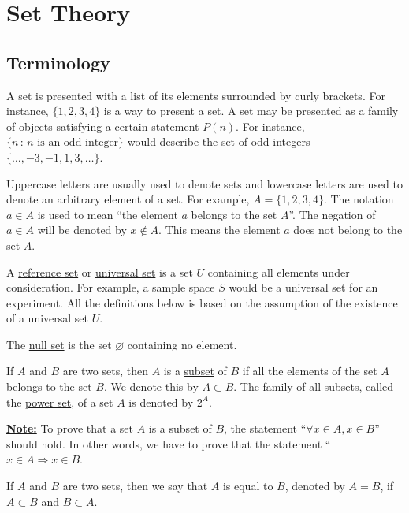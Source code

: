 \chapter{Set Theory}


\section{Terminology}

A set is presented with a list of its elements surrounded by curly brackets. For instance, $\{1, 2, 3, 4\}$ is a way to present a set. A set may be presented as a family of objects satisfying a certain statement $P (n)$. For instance, $\{ n \, : \, n \text{ is an odd integer}\}$ would describe the set of odd integers $\{ \ldots , -3 , -1 , 1, 3, \ldots \}$.

Uppercase letters are usually used to denote sets and lowercase letters are used to denote an arbitrary element of a set. For example, $A = \{ 1 , 2, 3, 4\}$. The notation $a \in A$ is used to mean ``the element $a$ belongs to the set $A$''. The negation of $a \in A$ will be denoted by $x \not\in A$. This means the element $a$ does not belong to the set $A$. 

A \underline{reference set} or \underline{universal set} is a set $U$ containing all elements under consideration. For example, a sample space $S$ would be a universal set for an experiment. All the definitions below is based on the assumption of the existence of a universal set $U$.

\begin{definition}
The \underline{null set} is the set $\varnothing$ containing no element.
\end{definition}

\begin{definition}
If $A$ and $B$ are two sets, then $A$ is a \underline{subset} of $B$ if all the elements of the set $A$ belongs to the set $B$. We denote this by $A \subset B$. The family of all subsets, called the \underline{power set}, of a set $A$ is denoted by $2^A$.
\end{definition}

\underline{\textbf{Note:}} To prove that a set $A$ is a subset of $B$, the statement ``$\forall x \in A, x \in B$'' should hold. In other words, we have to prove that the statement ``$x \in A \Rightarrow x \in B$.

\begin{definition}
If $A$ and $B$ are two sets, then we say that $A$ is equal to $B$, denoted by $A = B$, if $A \subset B$ and $B \subset A$.
\end{definition}

